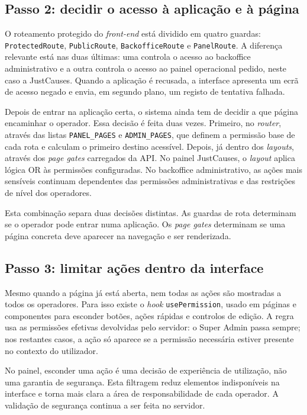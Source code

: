 \subsection{Passo 2: decidir o acesso à aplicação e à página}
\label{subsec:auth_step2}

O roteamento protegido do \textit{front-end} está dividido em quatro guardas: \texttt{ProtectedRoute}, \texttt{PublicRoute}, \texttt{BackofficeRoute} e \texttt{PanelRoute}. A diferença relevante está nas duas últimas: uma controla o acesso ao backoffice administrativo e a outra controla o acesso ao painel operacional pedido, neste caso a JustCauses. Quando a aplicação é recusada, a interface apresenta um ecrã de acesso negado e envia, em segundo plano, um registo de tentativa falhada.

Depois de entrar na aplicação certa, o sistema ainda tem de decidir a que página encaminhar o operador. Essa decisão é feita duas vezes. Primeiro, no \textit{router}, através das listas \texttt{PANEL\_PAGES} e \texttt{ADMIN\_PAGES}, que definem a permissão base de cada rota e calculam o primeiro destino acessível. Depois, já dentro dos \textit{layouts}, através dos \textit{page gates} carregados da \gls{API}. No painel JustCauses, o \textit{layout} aplica lógica OR às permissões configuradas. No backoffice administrativo, as ações mais sensíveis continuam dependentes das permissões administrativas e das restrições de nível dos operadores.

Esta combinação separa duas decisões distintas. As guardas de rota determinam se o operador pode entrar numa aplicação. Os \textit{page gates} determinam se uma página concreta deve aparecer na navegação e ser renderizada.

\subsection{Passo 3: limitar ações dentro da interface}
\label{subsec:auth_step3}

Mesmo quando a página já está aberta, nem todas as ações são mostradas a todos os operadores. Para isso existe o \textit{hook} \texttt{usePermission}, usado em páginas e componentes para esconder botões, ações rápidas e controlos de edição. A regra usa as permissões efetivas devolvidas pelo servidor: o Super Admin passa sempre; nos restantes casos, a ação só aparece se a permissão necessária estiver presente no contexto do utilizador.

No painel, esconder uma ação é uma decisão de experiência de utilização, não uma garantia de segurança. Esta filtragem reduz elementos indisponíveis na interface e torna mais clara a área de responsabilidade de cada operador. A validação de segurança continua a ser feita no servidor.

